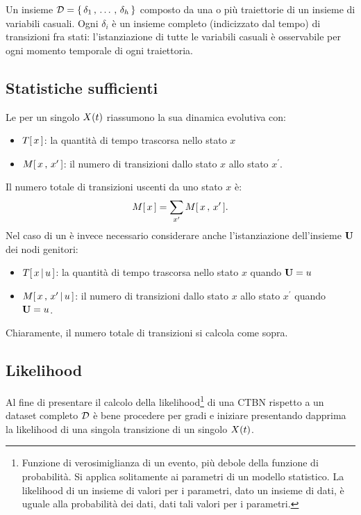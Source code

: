 \begin{definizione}
\label{defn:dataset-completo}
Un insieme $\mathcal{D}=\{\,\delta_1\,,\,\dotsc\,,\,\delta_h\,\}$ composto da una o più traiettorie di un insieme di variabili casuali. Ogni $\delta_i$ è un insieme completo (indicizzato dal tempo) di transizioni fra stati: l'istanziazione di tutte le variabili casuali è osservabile per ogni momento temporale di ogni traiettoria.
\end{definizione}

\subsection{Statistiche sufficienti}
\label{sec:ctbn-sufficient-stats}
Le \emph{\stats{}} per un singolo \mprocess*{} \omog*{} $\mathnormal{X}(t)$ riassumono la sua dinamica evolutiva con:
\begin{itemize}
    \item $T[\,x\,]$: la quantità di tempo trascorsa nello stato $x$
    \item $\mstat[x]{x^\prime}$: il numero di transizioni dallo stato $x$ allo stato $x^\prime$.
\end{itemize}

Il numero totale di transizioni uscenti da uno stato $x$ è:
\[
\mstat{x}=\sum_{x^\prime}\mstat[x]{x^\prime}\text{.}
\]
Nel caso di un \mprocess*{} \cond*{} è invece necessario considerare anche l'istanziazione dell'insieme $\mathbf{U}$ dei nodi genitori:
\begin{itemize}
    \item $T[\,x\,\arrowvert\,u\,]$: la quantità di tempo trascorsa nello stato $x$ quando $\mathbf{U}=u$
    \item $\mstat[x]{x^\prime\,\arrowvert\,u}$: il numero di transizioni dallo stato $x$ allo stato $x^\prime$ quando $\mathbf{U}=u$.
\end{itemize}
Chiaramente, il numero totale di transizioni si calcola come sopra.

\subsection{Likelihood}
\label{sec:ctbn-likelihood}
Al fine di presentare il calcolo della likelihood\footnote{Funzione di verosimiglianza di un evento, più debole della funzione di probabilità. Si applica solitamente ai parametri di un modello statistico. La likelihood di un insieme di valori per i parametri, dato un insieme di dati, è uguale alla probabilità dei dati, dati tali valori per i parametri.} di una \acs{CTBN} rispetto a un dataset completo $\mathcal{D}$ è bene procedere per gradi e iniziare presentando dapprima la likelihood di una singola transizione di un singolo \mprocess*{} \omog*{} $\mathnormal{X}(t)$.

